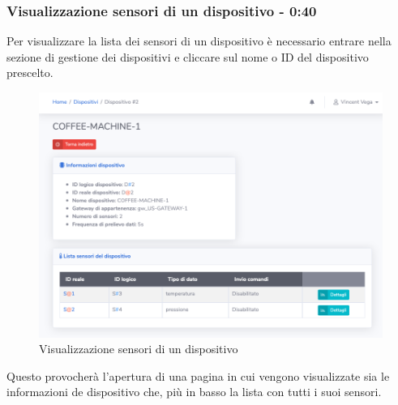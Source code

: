 	\subsubsection{Visualizzazione sensori di un dispositivo - 0:40}
		Per visualizzare la lista dei sensori di un dispositivo è necessario entrare nella sezione di gestione dei dispositivi e cliccare sul nome o ID del dispositivo prescelto.
		\begin{figure}[H]
		\centering
		\includegraphics[scale=0.600]{res/images/membro/visSensori.png}
		\caption{Visualizzazione sensori di un dispositivo}
		\end{figure}
		Questo provocherà l'apertura di una pagina in cui vengono visualizzate sia le informazioni de dispositivo che, più in basso la lista con tutti i suoi sensori.


